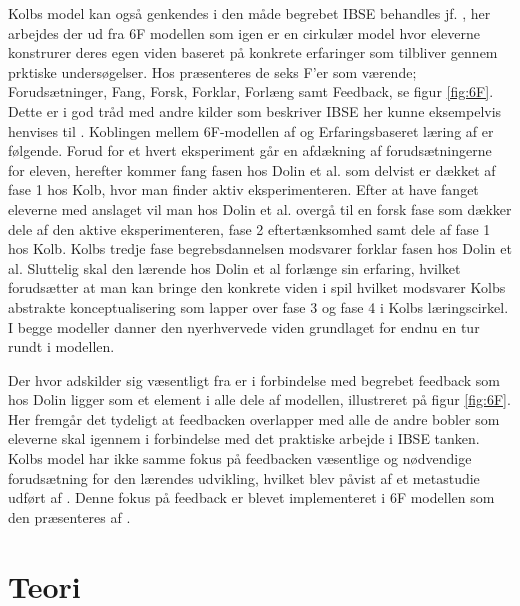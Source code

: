 Kolbs model kan også genkendes i den måde begrebet IBSE behandles jf. \citep{Dolin2014}, her arbejdes der ud fra 6F modellen som igen er en  cirkulær model hvor eleverne konstrurer deres egen viden baseret på konkrete erfaringer som tilbliver gennem prktiske undersøgelser. Hos \citet{Dolin2014} præsenteres de seks F'er som værende; Forudsætninger, Fang, Forsk, Forklar, Forlæng samt Feedback, se figur \vref{fig:6F}. Dette er i god tråd med andre kilder som beskriver IBSE her kunne eksempelvis henvises til \citep{Krogh2016}.
Koblingen mellem 6F-modellen af \citep{Dolin2014} og Erfaringsbaseret læring af \citep{Kolb1984} er følgende. Forud for et hvert eksperiment går en afdækning af forudsætningerne for eleven, herefter kommer fang fasen hos Dolin et al. som delvist er dækket af fase 1 hos Kolb, hvor man finder aktiv eksperimenteren. Efter at have fanget eleverne med anslaget vil man hos Dolin et al. overgå til en forsk fase som dækker dele af den aktive eksperimenteren, fase 2  eftertænksomhed samt dele af fase 1  hos Kolb. Kolbs tredje fase begrebsdannelsen modsvarer forklar fasen hos Dolin et al. Sluttelig skal den lærende hos Dolin et al forlænge sin erfaring, hvilket forudsætter at man kan bringe den konkrete viden i spil hvilket modsvarer Kolbs abstrakte konceptualisering som lapper over fase 3 og fase 4 i Kolbs læringscirkel. I begge modeller danner den nyerhvervede viden grundlaget for endnu en tur rundt i modellen.


Der hvor \citet{Dolin2014} adskilder sig væsentligt fra \citet{Kolb1984} er i forbindelse med begrebet feedback som hos Dolin ligger som et element i alle dele af modellen, illustreret på figur \vref{fig:6F}. Her fremgår det tydeligt at feedbacken overlapper med alle de andre bobler som eleverne skal igennem i forbindelse med det praktiske arbejde i IBSE tanken. Kolbs model har ikke samme fokus på feedbacken væsentlige og nødvendige forudsætning for den lærendes udvikling, hvilket blev påvist af et metastudie udført af \citep{Hattie2015}. Denne fokus på feedback er blevet implementeret i 6F modellen som den præsenteres af \citep{Dolin2014}.

\section{Teori}
\label{sec:teo}

